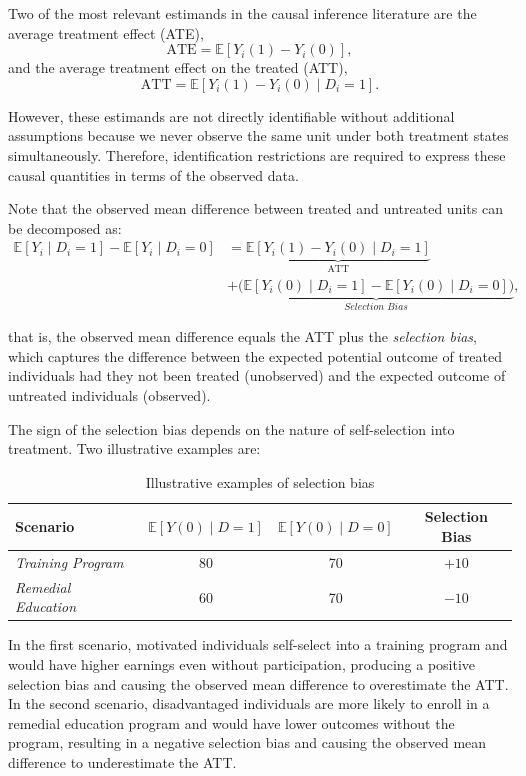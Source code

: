 Two of the most relevant estimands in the causal inference literature are the average treatment effect (ATE),
\[
\text{ATE} = \mathbb{E}[Y_i(1) - Y_i(0)],
\]
and the average treatment effect on the treated (ATT),
\[
\text{ATT} = \mathbb{E}[Y_i(1) - Y_i(0) \mid D_i = 1].
\]

However, these estimands are not directly identifiable without additional assumptions because we never observe the same unit under both treatment states simultaneously. Therefore, identification restrictions are required to express these causal quantities in terms of the observed data.

Note that the observed mean difference between treated and untreated units can be decomposed as:
\begin{align*}
\mathbb{E}[Y_i \mid D_i = 1] - \mathbb{E}[Y_i \mid D_i = 0] 
& = \underbrace{\mathbb{E}[Y_i(1) - Y_i(0) \mid D_i = 1]}_{\text{ATT}}\\
& + \underbrace{\Big( \mathbb{E}[Y_i(0) \mid D_i = 1] - \mathbb{E}[Y_i(0) \mid D_i = 0]\Big)}_{\textit{Selection Bias}},
\end{align*}

that is, the observed mean difference equals the ATT plus the \textit{selection bias}, which captures the difference between the expected potential outcome of treated individuals had they not been treated (unobserved) and the expected outcome of untreated individuals (observed). 

The sign of the selection bias depends on the nature of self-selection into treatment. Two illustrative examples are:

\begin{table}[H]
	\caption{Illustrative examples of selection bias}
	\begin{minipage}{0.5\textwidth} %
		
		\begin{tabular}{lccc}
			\hline
			\textbf{Scenario} & $\mathbb{E}[Y(0)\mid D=1]$ & $\mathbb{E}[Y(0)\mid D=0]$ & Selection Bias \\
			\hline
			\textit{Training Program} & 80 & 70 & $+10$ \\
			\textit{Remedial Education} & 60 & 70 & $-10$ \\
			\hline
		\end{tabular}
	\end{minipage}
\end{table}

In the first scenario, motivated individuals self-select into a training program and would have higher earnings even without participation, producing a positive selection bias and causing the observed mean difference to overestimate the ATT. In the second scenario, disadvantaged individuals are more likely to enroll in a remedial education program and would have lower outcomes without the program, resulting in a negative selection bias and causing the observed mean difference to underestimate the ATT.

